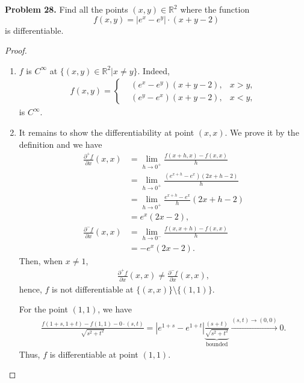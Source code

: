 \documentclass[12pt,leqno]{amsart}
\theoremstyle{definition}
\begin{document}
\medskip

\noindent
{\bf Problem 28.}
Find all the points $(x,y)\in\mathbb{R}^2$ where the function
$$
f(x,y)=|e^x-e^y|\cdot(x+y-2)
$$
is differentiable.
\begin{proof}
~\begin{enumerate}[label=(\arabic*)]
    \item $f$ is $C^\infty$ at $\{(x,y) \in \mathbb{R}^2| x \neq y\}$. Indeed, 
    \begin{align*}
        f(x,y) = \left\{
        \begin{aligned}
            & \left(e^x - e^y\right)(x+y-2), & x > y,\\
            & \left(e^y - e^x\right)(x+y-2), & x < y,
        \end{aligned}
        \right.
    \end{align*}
    is $C^\infty$. 
    
    \item It remains to show the differentiability at point $(x,x)$. We prove it by the definition and we have
    \begin{align*}
        \frac{\partial^+ f}{\partial x}(x,x) & = \lim_{h\to 0^+} \frac{f(x+h,x) - f(x,x)}{h} \\
        & = \lim_{h\to 0^+} \frac{\left(e^{x+h} - e^x\right)(2x+h-2)}{h} \\
        & = \lim_{h\to 0^+} \frac{e^{x+h} - e^x}{h} (2x+h-2) \\
        & = e^x (2x-2), \\
        \frac{\partial^- f}{\partial x}(x,x) & = \lim_{h\to 0^-} \frac{f(x,x+h) - f(x,x)}{h} \\
        & = - e^x (2x-2).
    \end{align*}
    Then, when $x\neq 1$,
    \begin{align*}
        \frac{\partial^+ f}{\partial x}(x,x) \neq \frac{\partial^- f}{\partial x}(x,x),
    \end{align*}
    hence, $f$ is not differentiable at $\{(x,x)\}\setminus \{(1,1)\}$.
    
    For the point $(1,1)$, we have 
    \begin{align*}
        \frac{f(1+s,1+t) - f(1,1) - 0\cdot (s,t)}{\sqrt{s^2+t^2}} = \left|e^{1+s} - e^{1+t}\right| \underbrace{\frac{ (s+t)}{\sqrt{s^2+t^2}}}_{\text{bounded}} \xrightarrow{(s,t)\to (0,0)} 0.
    \end{align*}
    Thus, $f$ is differentiable at point $(1,1)$.
\end{enumerate}
\end{proof}
\end{document}
